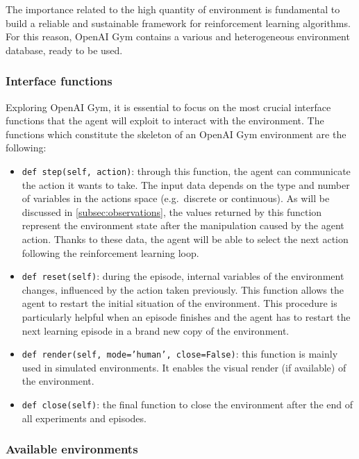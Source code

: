 The importance related to the high quantity of environment is fundamental to build a reliable and sustainable framework for reinforcement learning algorithms.
For this reason, OpenAI Gym contains a various and heterogeneous environment database, ready to be used.

\subsubsection{Interface functions}

Exploring OpenAI Gym, it is essential to focus on the most crucial interface functions that the agent will exploit to interact with the environment.
The functions which constitute the skeleton of an OpenAI Gym environment are the following:
\begin{itemize}
	\item \texttt{def step(self, action)}: through this function, the agent can communicate the action it wants to take.
The input data depends on the type and number of variables in the actions space (e.g.\ discrete or continuous).
As will be discussed in \vref{subsec:observations}, the values returned by this function represent the environment state after the manipulation caused by the agent action.
Thanks to these data, the agent will be able to select the next action following the reinforcement learning loop.
	\item \texttt{def reset(self)}: during the episode, internal variables of the environment changes, influenced by the action taken previously.
This function allows the agent to restart the initial situation of the environment.
This procedure is particularly helpful when an episode finishes and the agent has to restart the next learning episode in a brand new copy of the environment.
	\item \texttt{def render(self, mode='human', close=False)}: this function is mainly used in simulated environments.
It enables the visual render (if available) of the environment.
	\item \texttt{def close(self)}: the final function to close the environment after the end of all experiments and episodes.
\end{itemize}

\subsubsection{Available environments}

